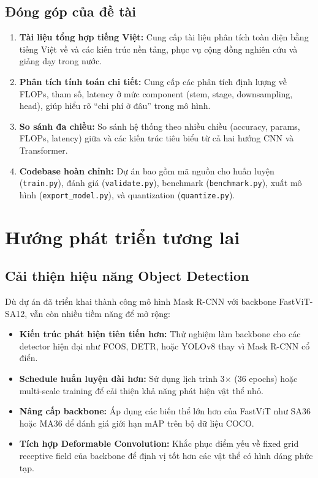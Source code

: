 \subsection{Đóng góp của đề tài}
\label{subsec:contributions}

\begin{enumerate}
    \item \textbf{Tài liệu tổng hợp tiếng Việt:} Cung cấp tài liệu phân tích toàn diện bằng tiếng Việt về \fastvit{} và các kiến trúc nền tảng, phục vụ cộng đồng nghiên cứu và giảng dạy trong nước.
    
    \item \textbf{Phân tích tính toán chi tiết:} Cung cấp các phân tích định lượng về FLOPs, tham số, latency ở mức component (stem, stage, downsampling, head), giúp hiểu rõ ``chi phí ở đâu'' trong mô hình.
    
    \item \textbf{So sánh đa chiều:} So sánh hệ thống theo nhiều chiều (accuracy, params, FLOPs, latency) giữa \fastvit{} và các kiến trúc tiêu biểu từ cả hai hướng CNN và Transformer.
    
    \item \textbf{Codebase hoàn chỉnh:} Dự án bao gồm mã nguồn cho huấn luyện (\texttt{train.py}), đánh giá (\texttt{validate.py}), benchmark (\texttt{benchmark.py}), xuất mô hình (\texttt{export\_model.py}), và quantization (\texttt{quantize.py}).
\end{enumerate}

\section{Hướng phát triển tương lai}
\label{sec:future_work}

\subsection{Cải thiện hiệu năng Object Detection}
\label{subsec:detection}

Dù dự án đã triển khai thành công mô hình Mask R-CNN với backbone FastViT-SA12, vẫn còn nhiều tiềm năng để mở rộng:
\begin{itemize}
    \item \textbf{Kiến trúc phát hiện tiên tiến hơn:} Thử nghiệm \fastvit{} làm backbone cho các detector hiện đại như FCOS, DETR, hoặc YOLOv8 thay vì Mask R-CNN cổ điển.
    \item \textbf{Schedule huấn luyện dài hơn:} Sử dụng lịch trình 3$\times$ (36 epochs) hoặc multi-scale training để cải thiện khả năng phát hiện vật thể nhỏ.
    \item \textbf{Nâng cấp backbone:} Áp dụng các biến thể lớn hơn của FastViT như SA36 hoặc MA36 để đánh giá giới hạn mAP trên bộ dữ liệu COCO.
    \item \textbf{Tích hợp Deformable Convolution:} Khắc phục điểm yếu về fixed grid receptive field của backbone để định vị tốt hơn các vật thể có hình dáng phức tạp.
\end{itemize}


